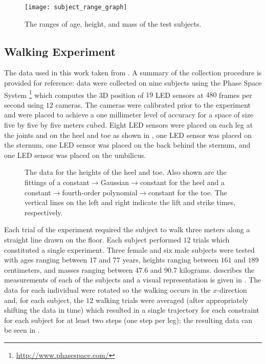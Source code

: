 

\begin{figure}[t!]
  \centering
  \texttt{[image: subject\_range\_graph]}
  \caption{The ranges of age, height, and mass of the test subjects.}
  \label{fig:subject-ranges}
\end{figure}

\subsection{Walking Experiment}
The data used in this work taken from \cite{Ames2011a}.
%
A summary of the collection procedure is provided for reference:
%
data were collected on nine subjects using the Phase Space System%
%
\footnote{\url{http://www.phasespace.com/}}\xspace
%
which computes the 3D position of $19$ LED sensors at $480$ frames per second
using $12$ cameras.
%
The cameras were calibrated prior to the experiment and were placed to achieve a
one millimeter level of accuracy for a space of size five by five by five meters
cubed.
%
Eight LED sensors were placed on each leg at the joints and on the heel and toe
as shown in , one LED sensor was placed on the sternum, one
LED sensor was placed on the back behind the sternum, and one LED sensor was
placed on the umbilicus.

\begin{figure}[t!]
  \centering
  \caption[The data for the heights of the heel and toe.]{The data for the
    heights of the heel and toe.
    Also shown are the fittings of a constant$\to$Gaussian$\to$constant for the
    heel and a constant$\to$fourth-order polynomial$\to$constant for the toe.
    The vertical lines on the left and right indicate the lift and strike times,
    respectively.}
  \label{fig:heeltoefit}
\end{figure}


Each trial of the experiment required the subject to walk three meters along a
straight line drawn on the floor.
%
Each subject performed $12$ trials which constituted a single experiment.
%
Three female and six male subjects were tested with ages ranging between $17$
and $77$ years, heights ranging between $161$ and $189$ centimeters, and masses
ranging between $47.6$ and $90.7$ kilograms.
%
 describes the measurements of each of the subjects and
a visual representation is given in .
%
The data for each individual were rotated so the walking occurs in the
$x$-direction and, for each subject, the $12$ walking trials were averaged
(after appropriately shifting the data in time) which resulted in a single
trajectory for each constraint for each subject for at least two steps (one step
per leg);
%
the resulting data can be seen in .

